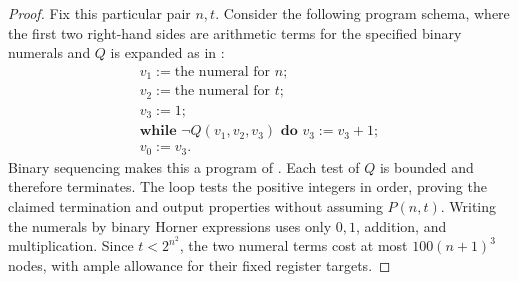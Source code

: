 \begin{proof}
Fix this particular pair $n,t$.  Consider the following program schema,
where the first two right-hand sides are arithmetic terms for the
specified binary numerals and $Q$ is expanded as in
:
\[
 \begin{array}{l}
 v_1:=\text{the numeral for }n;\\
 v_2:=\text{the numeral for }t;\\
 v_3:=1;\\
 \textbf{while }\neg Q(v_1,v_2,v_3)\textbf{ do }v_3:=v_3+1;\\
 v_0:=v_3.
 \end{array}
\]
Binary sequencing makes this a program of
.  Each test of $Q$ is bounded and therefore
terminates.  The loop tests the positive integers in order, proving the
claimed termination and output properties without assuming $P(n,t)$.
Writing the numerals by binary Horner
expressions uses only $0,1$, addition, and multiplication.  Since
$t<2^{n^2}$, the two numeral terms cost at most $100(n+1)^3$ nodes,
with ample allowance for their fixed register targets.


\end{proof}
